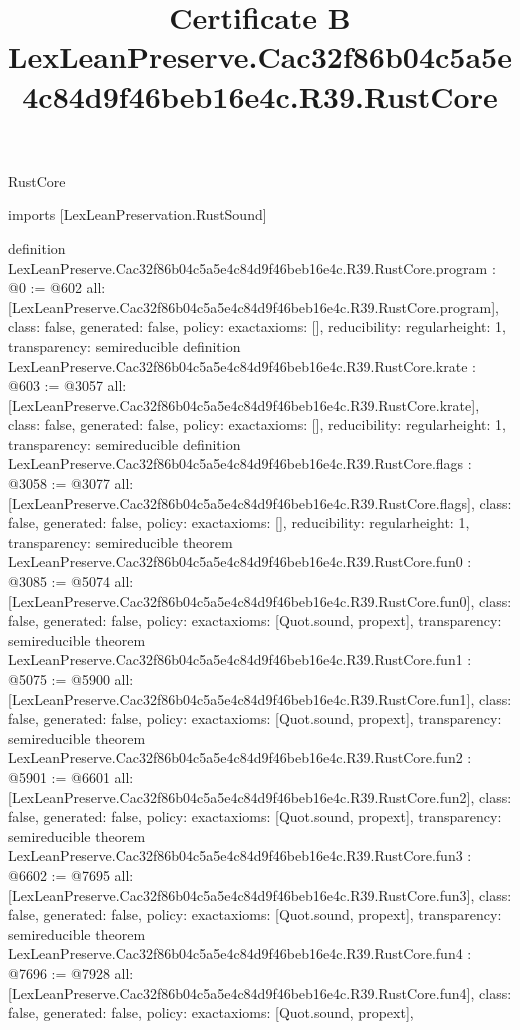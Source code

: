 \begin{lexlean}{RustCore}
\title{Certificate B LexLeanPreserve.Cac32f86b04c5a5e4c84d9f46beb16e4c.R39.RustCore}
\begin{coremodule}
imports [LexLeanPreservation.RustSound]

definition LexLeanPreserve.Cac32f86b04c5a5e4c84d9f46beb16e4c.R39.RustCore.program : @0 := @602 {
  all: [LexLeanPreserve.Cac32f86b04c5a5e4c84d9f46beb16e4c.R39.RustCore.program],
  class: false,
  generated: false,
  policy: exact{axioms: []},
  reducibility: regular{height: 1},
  transparency: semireducible
}
definition LexLeanPreserve.Cac32f86b04c5a5e4c84d9f46beb16e4c.R39.RustCore.krate : @603 := @3057 {
  all: [LexLeanPreserve.Cac32f86b04c5a5e4c84d9f46beb16e4c.R39.RustCore.krate],
  class: false,
  generated: false,
  policy: exact{axioms: []},
  reducibility: regular{height: 1},
  transparency: semireducible
}
definition LexLeanPreserve.Cac32f86b04c5a5e4c84d9f46beb16e4c.R39.RustCore.flags : @3058 := @3077 {
  all: [LexLeanPreserve.Cac32f86b04c5a5e4c84d9f46beb16e4c.R39.RustCore.flags],
  class: false,
  generated: false,
  policy: exact{axioms: []},
  reducibility: regular{height: 1},
  transparency: semireducible
}
theorem LexLeanPreserve.Cac32f86b04c5a5e4c84d9f46beb16e4c.R39.RustCore.fun0 : @3085 := @5074 {
  all: [LexLeanPreserve.Cac32f86b04c5a5e4c84d9f46beb16e4c.R39.RustCore.fun0],
  class: false,
  generated: false,
  policy: exact{axioms: [Quot.sound, propext]},
  transparency: semireducible
}
theorem LexLeanPreserve.Cac32f86b04c5a5e4c84d9f46beb16e4c.R39.RustCore.fun1 : @5075 := @5900 {
  all: [LexLeanPreserve.Cac32f86b04c5a5e4c84d9f46beb16e4c.R39.RustCore.fun1],
  class: false,
  generated: false,
  policy: exact{axioms: [Quot.sound, propext]},
  transparency: semireducible
}
theorem LexLeanPreserve.Cac32f86b04c5a5e4c84d9f46beb16e4c.R39.RustCore.fun2 : @5901 := @6601 {
  all: [LexLeanPreserve.Cac32f86b04c5a5e4c84d9f46beb16e4c.R39.RustCore.fun2],
  class: false,
  generated: false,
  policy: exact{axioms: [Quot.sound, propext]},
  transparency: semireducible
}
theorem LexLeanPreserve.Cac32f86b04c5a5e4c84d9f46beb16e4c.R39.RustCore.fun3 : @6602 := @7695 {
  all: [LexLeanPreserve.Cac32f86b04c5a5e4c84d9f46beb16e4c.R39.RustCore.fun3],
  class: false,
  generated: false,
  policy: exact{axioms: [Quot.sound, propext]},
  transparency: semireducible
}
theorem LexLeanPreserve.Cac32f86b04c5a5e4c84d9f46beb16e4c.R39.RustCore.fun4 : @7696 := @7928 {
  all: [LexLeanPreserve.Cac32f86b04c5a5e4c84d9f46beb16e4c.R39.RustCore.fun4],
  class: false,
  generated: false,
  policy: exact{axioms: [Quot.sound, propext]},
}
\end{coremodule}
\end{lexlean}
